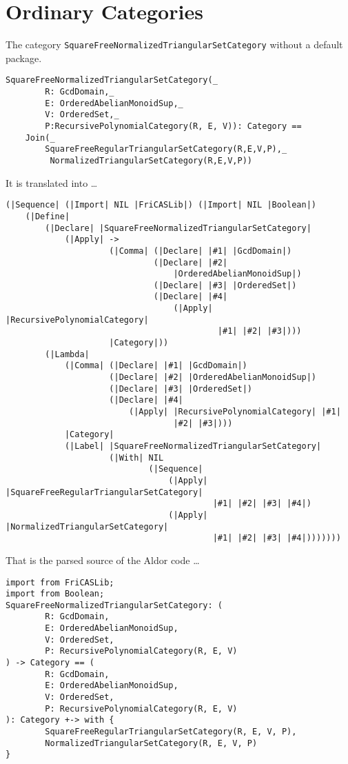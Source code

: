 \documentclass{article}
\begin{document}
\section{Ordinary Categories}\label{sec:Category}
The category \verb'SquareFreeNormalizedTriangularSetCategory' without
a default package.
\begin{verbatim}
SquareFreeNormalizedTriangularSetCategory(_
        R: GcdDomain,_
        E: OrderedAbelianMonoidSup,_
        V: OrderedSet,_
        P:RecursivePolynomialCategory(R, E, V)): Category ==
    Join(_
        SquareFreeRegularTriangularSetCategory(R,E,V,P),_
         NormalizedTriangularSetCategory(R,E,V,P))
\end{verbatim}
It is translated into \ldots
\begin{verbatim}
(|Sequence| (|Import| NIL |FriCASLib|) (|Import| NIL |Boolean|)
    (|Define|
        (|Declare| |SquareFreeNormalizedTriangularSetCategory|
            (|Apply| ->
                     (|Comma| (|Declare| |#1| |GcdDomain|)
                              (|Declare| |#2|
                                  |OrderedAbelianMonoidSup|)
                              (|Declare| |#3| |OrderedSet|)
                              (|Declare| |#4|
                                  (|Apply| |RecursivePolynomialCategory|
                                           |#1| |#2| |#3|)))
                     |Category|))
        (|Lambda|
            (|Comma| (|Declare| |#1| |GcdDomain|)
                     (|Declare| |#2| |OrderedAbelianMonoidSup|)
                     (|Declare| |#3| |OrderedSet|)
                     (|Declare| |#4|
                         (|Apply| |RecursivePolynomialCategory| |#1|
                                  |#2| |#3|)))
            |Category|
            (|Label| |SquareFreeNormalizedTriangularSetCategory|
                     (|With| NIL
                             (|Sequence|
                                 (|Apply| |SquareFreeRegularTriangularSetCategory|
                                          |#1| |#2| |#3| |#4|)
                                 (|Apply| |NormalizedTriangularSetCategory|
                                          |#1| |#2| |#3| |#4|)))))))
\end{verbatim}
That is the parsed source of the Aldor code \ldots
\begin{verbatim}
import from FriCASLib;
import from Boolean;
SquareFreeNormalizedTriangularSetCategory: (
        R: GcdDomain,
        E: OrderedAbelianMonoidSup,
        V: OrderedSet,
        P: RecursivePolynomialCategory(R, E, V)
) -> Category == (
        R: GcdDomain,
        E: OrderedAbelianMonoidSup,
        V: OrderedSet,
        P: RecursivePolynomialCategory(R, E, V)
): Category +-> with {
        SquareFreeRegularTriangularSetCategory(R, E, V, P),
        NormalizedTriangularSetCategory(R, E, V, P)
}
\end{verbatim}
\end{document}
